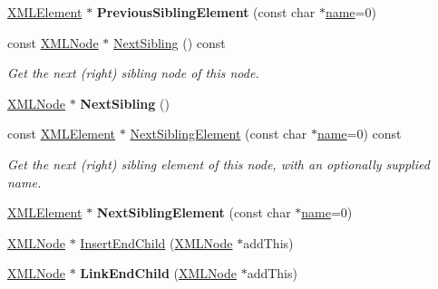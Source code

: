 \begin{DoxyCompactItemize}
\hyperlink{classtinyxml2_1_1_x_m_l_element}{X\+M\+L\+Element} $\ast$ {\bfseries Previous\+Sibling\+Element} (const char $\ast$\hyperlink{structname}{name}=0)
\item 
\mbox{\label{classtinyxml2_1_1_x_m_l_node_a79db9ef0fe014d27790f2218b87bcbb5}} 
const \hyperlink{classtinyxml2_1_1_x_m_l_node}{X\+M\+L\+Node} $\ast$ \hyperlink{classtinyxml2_1_1_x_m_l_node_a79db9ef0fe014d27790f2218b87bcbb5}{Next\+Sibling} () const
\begin{DoxyCompactList}\small\item\em Get the next (right) sibling node of this node. \end{DoxyCompactList}\item 
\mbox{\label{classtinyxml2_1_1_x_m_l_node_aeb7d4dfd8fb924ef86e7cb72183acbac}} 
\hyperlink{classtinyxml2_1_1_x_m_l_node}{X\+M\+L\+Node} $\ast$ {\bfseries Next\+Sibling} ()
\item 
\mbox{\label{classtinyxml2_1_1_x_m_l_node_a14ea560df31110ff07a9f566171bf797}} 
const \hyperlink{classtinyxml2_1_1_x_m_l_element}{X\+M\+L\+Element} $\ast$ \hyperlink{classtinyxml2_1_1_x_m_l_node_a14ea560df31110ff07a9f566171bf797}{Next\+Sibling\+Element} (const char $\ast$\hyperlink{structname}{name}=0) const
\begin{DoxyCompactList}\small\item\em Get the next (right) sibling element of this node, with an optionally supplied name. \end{DoxyCompactList}\item 
\mbox{\label{classtinyxml2_1_1_x_m_l_node_af1225412584d4a2126f55e96a12e0ec0}} 
\hyperlink{classtinyxml2_1_1_x_m_l_element}{X\+M\+L\+Element} $\ast$ {\bfseries Next\+Sibling\+Element} (const char $\ast$\hyperlink{structname}{name}=0)
\item 
\hyperlink{classtinyxml2_1_1_x_m_l_node}{X\+M\+L\+Node} $\ast$ \hyperlink{classtinyxml2_1_1_x_m_l_node_ae3b422e98914d6002ca99bb1d2837103}{Insert\+End\+Child} (\hyperlink{classtinyxml2_1_1_x_m_l_node}{X\+M\+L\+Node} $\ast$add\+This)
\item 
\mbox{\label{classtinyxml2_1_1_x_m_l_node_a663e3a5a378169fd477378f4d17a7649}} 
\hyperlink{classtinyxml2_1_1_x_m_l_node}{X\+M\+L\+Node} $\ast$ {\bfseries Link\+End\+Child} (\hyperlink{classtinyxml2_1_1_x_m_l_node}{X\+M\+L\+Node} $\ast$add\+This)

\end{DoxyCompactItemize}
